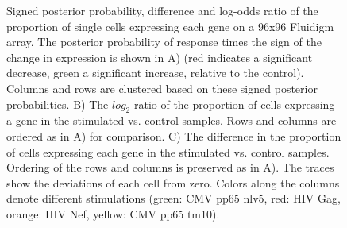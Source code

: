 \documentclass[11pt]{article}
\begin{document}
\begin{figure}[htbp]
\centering
{}
\caption{Signed posterior probability, difference and log-odds ratio of the proportion of single cells expressing each gene on a 96x96 Fluidigm array. The posterior probability of response times the sign of the change in expression is shown in A) (red indicates a significant decrease, green a significant increase, relative to the control). Columns and rows are clustered based on these signed posterior probabilities. B) The $log_2$ ratio of the proportion of cells expressing a gene in the stimulated vs. control samples. Rows and columns are ordered as in A) for comparison. C) The difference in the proportion of cells expressing each gene in the stimulated vs. control samples. Ordering of the rows and columns is preserved as in A). The traces show the deviations of each cell from zero. Colors along the columns denote different stimulations (green: CMV pp65 nlv5, red: HIV Gag, orange: HIV Nef, yellow: CMV pp65 tm10).}

\label{fig:fluidigm}
\end{figure}
\end{document}
